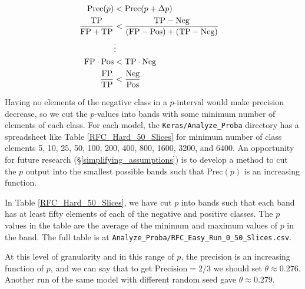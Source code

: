 \begin{equation} \label{eq:delta_p_2}\hfil
\begin{aligned}
	\text{Prec}(p) &< \text{Prec}(p + \Delta p) \cr
	\frac{\text{TP}}{\text{FP} + \text{TP}} &< 
	\frac{\text{TP} - \text{Neg}}{(\text{FP} - \text{Pos}) + (\text{TP} - \text{Neg})} \cr 
	&\vdots \cr
	\text{FP}\cdot \text{Pos} &< \text{TP} \cdot \text{Neg} \cr
	\frac{\text{FP}}{\text{TP}} &< \frac{\text{Neg}}{\text{Pos}} \cr
\end{aligned}
\end{equation}

\FloatBarrier

Having no elements of the negative class in a $p$-interval would make precision decrease, so we cut the $p$-values into bands with some minimum number of elements of each class.  For each model, the \verb|Keras/Analyze_Proba| directory has a spreadsheet like Table \ref{RFC_Hard_50_Slices} for minimum number of class elements 5, 10, 25, 50, 100, 200, 400, 800, 1600, 3200, and 6400.  An opportunity for future research (\S\ref{simplifying_assumptions}) is to develop a method to cut the $p$ output into the smallest possible bands such that $\text{Prec}(p)$ is an increasing function.  


In Table \ref{RFC_Hard_50_Slices}, we have cut $p$ into bands such that each band has at least fifty elements of each of the negative and positive classes.  The $p$ values in the table are the average of the minimum and maximum values of $p$ in the band.  The full table is at \verb|Analyze_Proba/RFC_Easy_Run_0_50_Slices.csv|.

At this level of granularity and in this range of $p$, the precision is an increasing function of $p$, and we can say that to get $\text{Precision} = 2/3$ we should set $\theta \approx 0.276$.   Another run of the same model with different random seed gave $\theta \approx 0.279$.



